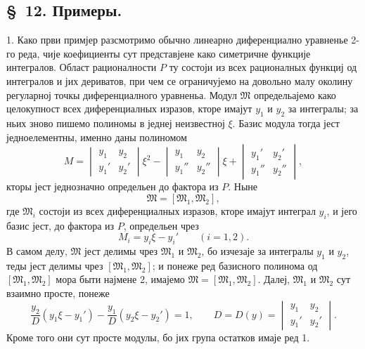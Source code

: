 ﻿\documentclass[11pt]{article}
\begin{document}

\setcounter{footnote}{23}
\subsection*{\S~12. Примеры.}

1. Како први примјер разсмотримо обычно линеарно диференциално уравненье 2-го реда, чије коефициенты сут представјене како симетричне функције интегралов. Област рационалности \(P\) ту состоји из всех рационалных функциј од интегралов и јих дериватов, при чем се ограничујемо на довольно малу околину регуларној точкы диференциалного уравненьа. Модул \(\mathfrak M\) определьајемо како целокупност всех диференциалных изразов, кторе имајут \(y_1\) и \(y_2\) за интегралы; за ньих зново пишемо полиномы в једнеј неизвестној \(\xi\). Базис модула тогда јест једноелементны, именно даны полиномом
\[
 M=
 \begin{vmatrix} y_1&y_2\\ y_1'&y_2'\end{vmatrix}\xi^2
 -\begin{vmatrix} y_1&y_2\\ y_1''&y_2''\end{vmatrix}\xi
 +\begin{vmatrix} y_1'&y_2'\\ y_1''&y_2''\end{vmatrix},
\]
кторы јест једнозначно определьен до фактора из \(P\). Ныне
\begin{equation}
 \mathfrak M=[\mathfrak M_1,
\mathfrak M_2],
\tag{41}
\end{equation}
где \(\mathfrak M_i\) состоји из всех диференциалных изразов, кторе имајут интеграл \(y_i\), и јего базис јест, до фактора из \(P\), определьен чрез
\[
 M_i=y_i\xi-y_i'\qquad(i=1,2).
\]
В самом делу, \(\mathfrak M\) јест делимы чрез \(\mathfrak M_1\) и \(\mathfrak M_2\), бо изчезаје за интегралы \(y_1\) и \(y_2\), теды јест делимы чрез \([\mathfrak M_1,
\mathfrak M_2]\); и понеже ред базисного полинома од \([\mathfrak M_1,
\mathfrak M_2]\) мора быти најмене 2, имајемо \(\mathfrak M=[\mathfrak M_1,
\mathfrak M_2]\). Далеј, \(\mathfrak M_1\) и \(\mathfrak M_2\) сут взаимно просте, понеже
\begin{equation}
 \frac{y_2}{D}(y_1\xi-y_1')-\frac{y_1}{D}(y_2\xi-y_2')=1,
 \qquad
 D=D(y)=\begin{vmatrix}y_1&y_2\\ y_1'&y_2'\end{vmatrix}.
\tag{42}
\end{equation}
Кроме того они сут просте модулы, бо јих група остатков имаје ред 1.
\end{document}
